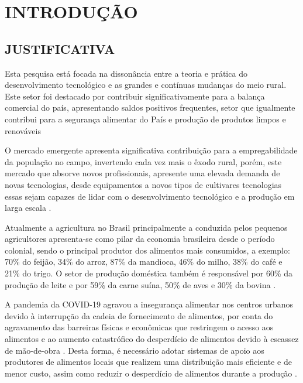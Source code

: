 \chapter{INTRODUÇÃO}



\section{JUSTIFICATIVA}

Esta pesquisa está focada na dissonância entre a teoria e prática do desenvolvimento tecnológico e as grandes e contínuas mudanças do meio rural. Este setor foi destacado por contribuir significativamente para a balança comercial do país, apresentando saldos positivos frequentes, setor que igualmente contribui para a segurança alimentar do País e produção de produtos limpos e renováveis \cite{Souza2014AgriculturaSaudaveis.}

O mercado emergente apresenta significativa contribuição para a empregabilidade da população no campo, invertendo cada vez mais o êxodo rural, porém, este mercado que absorve novos profissionais, apresente uma elevada demanda de novas tecnologias, desde equipamentos a novos tipos de cultivares tecnologias essas sejam capazes de lidar com o desenvolvimento tecnológico e a produção em larga escala \cite{deSouza2019ModernizacaoMaranhenses}. 

Atualmente a agricultura no Brasil principalmente a conduzida pelos pequenos agricultores apresenta-se como pilar da economia brasileira desde o período colonial, sendo o principal produtor dos alimentos mais consumidos, a exemplo: 70\% do feijão, 34\% do arroz, 87\% da mandioca, 46\% do milho, 38\% do café e 21\% do trigo. O setor de produção doméstica também é responsável por 60\% da produção de leite e por 59\% da carne suína, 50\% de aves e 30\% da bovina \cite{IBGE2017IBGERegionais}. 

A pandemia da COVID-19 agravou a insegurança alimentar nos centros urbanos devido à interrupção da cadeia de fornecimento de alimentos, por conta do agravamento das barreiras físicas e econômicas que restringem o acesso aos alimentos e ao aumento catastrófico do desperdício de alimentos devido à escassez de mão-de-obra \cite{Zurayk2020PandemicSecurity}. Desta forma, é necessário adotar sistemas de apoio aos produtores de alimentos locais que realizem uma distribuição mais eficiente e de menor custo, assim como reduzir o desperdício de alimentos durante a produção \cite{Brondeau2018TheMali}. 

